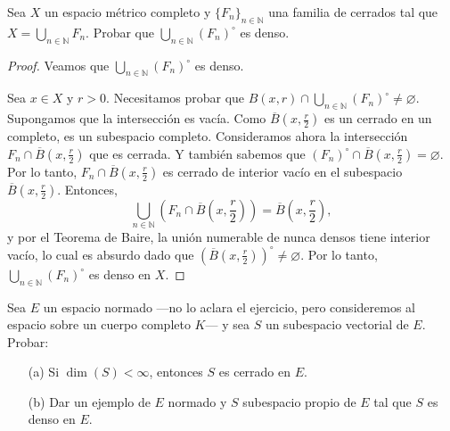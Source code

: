 \begin{exercise}
    Sea $X$ un espacio métrico completo y $\{F_n\}_{n \in \mathbb{N}}$ una familia de cerrados tal que $X = \bigcup_{n \in \mathbb{N}} F_n$. Probar que $\bigcup_{n \in \mathbb{N}} (F_n)^{\circ}$ es denso.
\end{exercise}

\begin{proof}
    Veamos que $\bigcup_{n \in \mathbb{N}} (F_n)^{\circ}$ es denso. 
    
    Sea $x \in X$ y $r > 0$. Necesitamos probar que $B(x, r) \cap \bigcup_{n \in \mathbb{N}} (F_n)^{\circ} \neq \varnothing$. Supongamos que la intersección es vacía. Como $\overline{B}\left(x, \frac{r}{2}\right)$ es un cerrado en un completo, es un subespacio completo. Consideramos ahora la intersección $F_n \cap \overline{B}\left(x, \frac{r}{2}\right)$ que es cerrada. Y también sabemos que $(F_n)^{\circ} \cap \overline{B}\left(x, \frac{r}{2}\right) = \varnothing$. Por lo tanto, $F_n \cap \overline{B}\left(x, \frac{r}{2}\right)$ es cerrado de interior vacío en el subespacio $\overline{B}\left(x, \frac{r}{2}\right)$. Entonces,
    \begin{equation*}
        \bigcup_{n \in \mathbb{N}} \left(F_n \cap \overline{B}\left(x, \frac{r}{2}\right)\right) = \overline{B}\left(x, \frac{r}{2}\right),
    \end{equation*}
    y por el Teorema de Baire, la unión numerable de nunca densos tiene interior vacío, lo cual es absurdo dado que $(\overline{B}\left(x, \frac{r}{2}\right))^{\circ} \neq \varnothing$. Por lo tanto, $\bigcup_{n \in \mathbb{N}} (F_n)^{\circ}$ es denso en $X$.
\end{proof}

\begin{exercise}
    Sea $E$ un espacio normado ---no lo aclara el ejercicio, pero consideremos al espacio sobre un cuerpo completo $K$--- y sea $S$ un subespacio vectorial de $E$. Probar:
    \begin{enumerate}
        \item[(a)] Si $\dim(S) < \infty$, entonces $S$ es cerrado en $E$.
        \item[(b)] Dar un ejemplo de $E$ normado y $S$ subespacio propio de $E$ tal que $S$ es denso en $E$.
    \end{enumerate}
\end{exercise}

